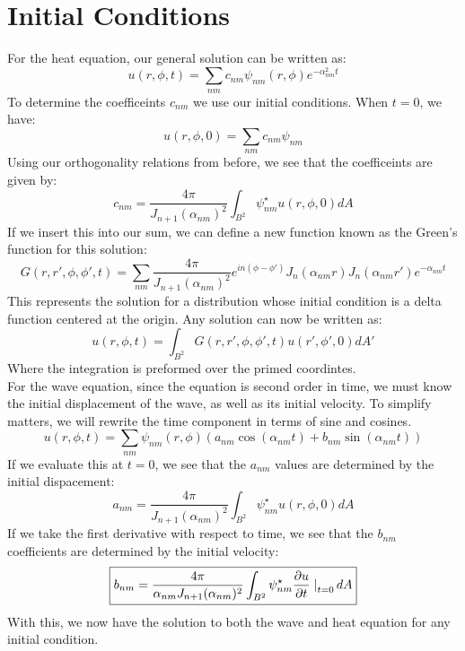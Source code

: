 \documentclass{paper}
\begin{document}
\section{Initial Conditions}
For the heat equation, our general solution can be written as:
\begin{equation}
    u(r,\phi,t)=\sum_{nm} c_{nm}\psi_{nm}(r,\phi)e^{-\alpha_{nm}^2 t}
\end{equation}
To determine the coefficeints $c_{nm}$ we use our initial conditions. When $t=0$, we have:
\begin{equation}u(r,\phi,0)=\sum_{nm}c_{nm}\psi_{nm}\end{equation}
Using our orthogonality relations from before, we see that the coefficeints are given by:
\begin{equation}
    \boxed{
        c_{nm}= \frac{4\pi}{J_{n+1}(\alpha_{nm})^2} \int_{B^2} \psi^\star_{nm} u(r,\phi,0) dA
    }
\end{equation}
If we insert this into our sum, we can define a new function known as the Green's function for this solution:
\begin{equation}G(r,r',\phi,\phi',t)=\sum_{nm}\frac{4\pi}{J_{n+1}(\alpha_{nm})^2} e^{in(\phi-\phi')} J_n(\alpha_{nm} r)J_n(\alpha_{nm}r')e^{-\alpha_{nm} t}\end{equation}
This represents the solution for a distribution whose initial condition is a delta function centered at the origin. Any solution can now be written as:
\begin{equation}u(r,\phi,t)=\int_{B^2} G(r,r',\phi,\phi',t)u(r',\phi',0)dA'\end{equation}
Where the integration is preformed over the primed coordintes.\\
For the wave equation, since the equation is second order in time, we must know the initial displacement of the wave, as well as its initial velocity. To simplify matters, we will rewrite the time component in terms of sine and cosines.
\begin{equation}u(r,\phi,t)=\sum_{nm}\psi_{nm}(r,\phi)\left(a_{nm}\cos(\alpha_{nm} t)+b_{nm}\sin(\alpha_{nm} t)\right)\end{equation}
If we evaluate this at $t=0$, we see that the $a_{nm}$ values are determined by the initial dispacement:
\begin{equation}
    \boxed{
    a_{nm}= \frac{4\pi}{J_{n+1}(\alpha_{nm})^2} \int_{B^2} \psi^\star_{nm} u(r,\phi,0) dA
    }
\end{equation}
If we take the first derivative with respect to time, we see that the $b_{nm}$ coefficients are determined by the initial velocity:
\begin{equation}
    \boxed{
    b_{nm}= \frac{4\pi}{\alpha_{nm}J_{n+1}(\alpha_{nm})^2} \int_{B^2} \psi^\star_{nm} \frac{\partial u}{\partial t}\left.\right|_{t=0} dA
    }
\end{equation}
With this, we now have the solution to both the wave and heat equation for any initial condition.
\end{document}
